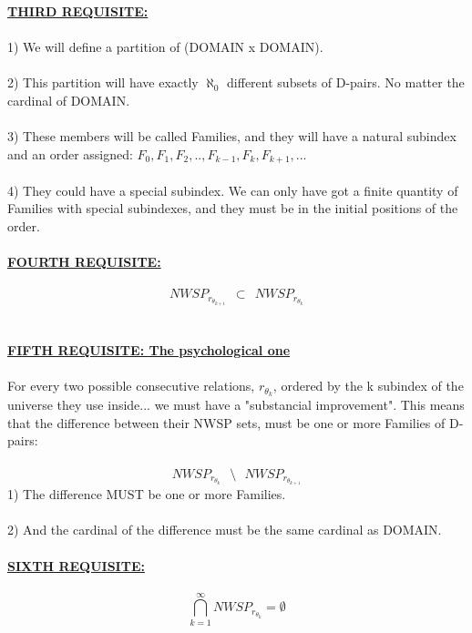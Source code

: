 		\newpage
		\noindent
		\underline{\textbf{THIRD REQUISITE:}}\\\\
		1) We will define a partition of (DOMAIN x DOMAIN).\\\\
		2) This partition will have exactly $\aleph_{0}$ different subsets of D-pairs. No matter the cardinal of DOMAIN.\\\\
		3) These members will be called Families, and they will have a natural subindex and an order assigned: $F_{0}, F_{1}, F_{2}, .. , F_{k-1}, F_{k}, F_{k+1}, ..$.\\\\
		4) They could have a special subindex. We can only have got a finite quantity of Families with special subindexes, and they must be in the initial positions of the order.
		\\\\
		
		\noindent
		\textbf{\underline{FOURTH REQUISITE:}}\\\\
		$$ 	NWSP_{r_{\theta_{k+1}}} \:\: \subset \:\: NWSP_{r_{\theta_{k}}} $$
		\\\\
		
		\noindent
		\textbf{\underline{FIFTH REQUISITE: The psychological one}}\\\\
		For every two possible consecutive relations, $r_{\theta_{k}}$, ordered by the k subindex of the universe they use inside... we must have a "substancial improvement". This means that the difference between their NWSP sets, must be one or more Families of D-pairs:\\\\
		$$ NWSP_{r_{\theta_{k}}}  \:\:\: \setminus \:\:\:  NWSP_{r_{\theta_{k+1}}} $$
		1) The difference MUST be one or more Families.\\\\
		2) And the cardinal of the difference must be the same cardinal as DOMAIN.
		\\\\
		
		\noindent
		\underline{\textbf{SIXTH REQUISITE:}}\\\\
		$$ \bigcap_{k=1}^{\infty} NWSP_{r_{\theta_{k}}} = \emptyset $$
		\\\\
		

